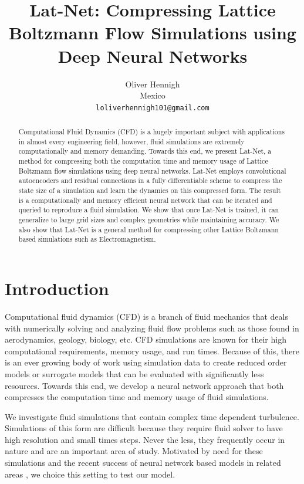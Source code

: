 \documentclass{article}
\title{Lat-Net: Compressing Lattice Boltzmann Flow Simulations using Deep Neural Networks}
\author{
  Oliver Hennigh \\
  Mexico \\
  \texttt{loliverhennigh101@gmail.com} \\
}
\begin{document}

\maketitle

\begin{abstract}
Computational Fluid Dynamics (CFD) is a hugely important subject with applications in almost every engineering field, however, fluid simulations are extremely computationally and memory demanding. Towards this end, we present Lat-Net, a method for compressing both the computation time and memory usage of Lattice Boltzmann flow simulations using deep neural networks. Lat-Net employs convolutional autoencoders and residual connections in a fully differentiable scheme to compress the state size of a simulation and learn the dynamics on this compressed form. The result is a computationally and memory efficient neural network that can be iterated and queried to reproduce a fluid simulation. We show that once Lat-Net is trained, it can generalize to large grid sizes and complex geometries while maintaining accuracy. We also show that Lat-Net is a general method for compressing other Lattice Boltzmann based simulations such as Electromagnetism.

\end{abstract}

\section{Introduction}

Computational fluid dynamics (CFD) is a branch of fluid mechanics that deals with numerically solving and analyzing fluid flow problems such as those found in aerodynamics, geology, biology, etc. CFD simulations are known for their high computational requirements, memory usage, and run times. Because of this, there is an ever growing body of work using simulation data to create reduced order models or surrogate models that can be evaluated with significantly less resources. Towards this end, we develop a neural network approach that both compresses the computation time and memory usage of fluid simulations.

We investigate fluid simulations that contain complex time dependent turbulence. Simulations of this form are difficult because they require fluid solver to have high resolution and small times steps. Never the less, they frequently occur in nature and are an important area of study. Motivated by need for these simulations and the recent success of neural network based models in related areas \cite{tompson2016accelerating} \cite{guo2016convolutional} \cite{yang2016data}, we choice this setting to test our model.
\end{document}
